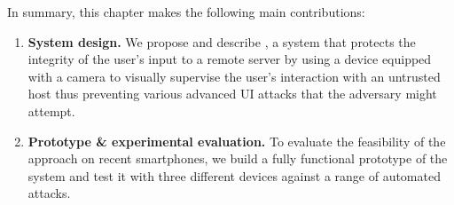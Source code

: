 In summary, this chapter makes the following main contributions:

\begin{enumerate}
  
	\item \textbf{System design.}
	We propose and describe \sysname, a system that protects the integrity of the user's input to a remote server by using a device equipped with a camera to visually supervise the user's interaction with an untrusted host thus preventing various advanced UI attacks that the adversary might attempt.


	\item \textbf{Prototype \& experimental evaluation.}
	To evaluate the feasibility of the approach on recent smartphones, we build a fully functional prototype of the \sysname system and test it with three different devices against a range of automated attacks.

\end{enumerate}
